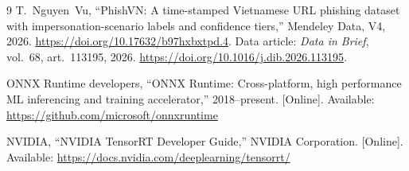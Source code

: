 \begin{thebibliography}{9}
 T.~Nguyen~Vu, ``PhishVN: A time-stamped Vietnamese URL phishing dataset with impersonation-scenario labels and confidence tiers,'' Mendeley Data, V4, 2026. \url{https://doi.org/10.17632/b97hxbxtpd.4}. Data article: \emph{Data in Brief}, vol.~68, art.~113195, 2026. \url{https://doi.org/10.1016/j.dib.2026.113195}.

 ONNX Runtime developers, ``ONNX Runtime: Cross-platform, high performance ML inferencing and training accelerator,'' 2018--present. [Online]. Available: \url{https://github.com/microsoft/onnxruntime}

 NVIDIA, ``NVIDIA TensorRT Developer Guide,'' NVIDIA Corporation. [Online]. Available: \url{https://docs.nvidia.com/deeplearning/tensorrt/}

\end{thebibliography}
